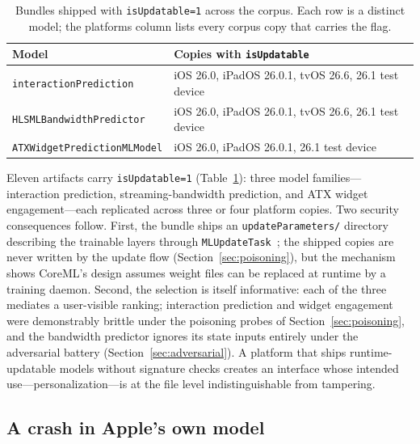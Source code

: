 \documentclass[letterpaper,twocolumn,10pt]{article}
\begin{document}
\begin{table}[t]
\centering
\caption{Bundles shipped with \texttt{isUpdatable=1} across the corpus.
Each row is a distinct model; the platforms column lists every corpus copy
that carries the flag.}
\label{tab:update}
\scriptsize
\setlength{\tabcolsep}{4pt}
\begin{tabular}{@{}>{\raggedright\arraybackslash}p{3.9cm}>{\raggedright\arraybackslash}p{4.0cm}@{}}
\toprule
\textbf{Model} & \textbf{Copies with \texttt{isUpdatable}} \\
\midrule
\texttt{interaction}\allowbreak\texttt{Prediction} & iOS 26.0, iPadOS 26.0.1, tvOS 26.6, 26.1 test device \\
\texttt{HLSML}\allowbreak\texttt{Bandwidth}\allowbreak\texttt{Predictor} & iOS 26.0, iPadOS 26.0.1, tvOS 26.6, 26.1 test device \\
\texttt{ATXWidget}\allowbreak\texttt{Prediction}\allowbreak\texttt{MLModel} & iOS 26.0, iPadOS 26.0.1, 26.1 test device \\
\bottomrule
\end{tabular}
\end{table}

Eleven artifacts carry \texttt{isUpdatable=1} (Table~\ref{tab:update}):
three model families---interaction prediction, streaming-bandwidth
prediction, and ATX widget engagement---each replicated across three or
four platform copies. Two security consequences follow. First, the bundle
ships an \texttt{update}\allowbreak\texttt{Parameters/} directory describing the trainable layers
through \texttt{MLUpdateTask}~\cite{mlupdatetask}; the shipped copies are
never written by the update flow (Section~\ref{sec:poisoning}), but the
mechanism shows CoreML's design assumes weight files can be replaced at
runtime by a training daemon. Second, the selection is itself informative:
each of the three mediates a user-visible ranking; interaction prediction
and widget engagement were demonstrably brittle under the poisoning probes
of Section~\ref{sec:poisoning}, and the bandwidth predictor ignores its
state inputs entirely under the adversarial battery
(Section~\ref{sec:adversarial}). A platform that ships runtime-updatable models without signature checks
creates an interface whose intended use---personalization---is at the file
level indistinguishable from tampering.

\subsection{A crash in Apple's own model}
\label{sec:crash}
\end{document}
